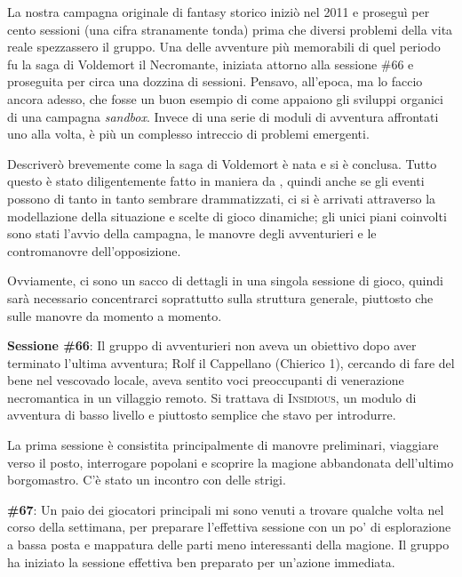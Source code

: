 
La nostra campagna originale di fantasy storico iniziò nel 2011 e proseguì per cento sessioni (una cifra stranamente tonda) prima che diversi problemi della vita reale spezzassero il gruppo. Una delle avventure più memorabili di quel periodo fu la saga di Voldemort il Necromante, iniziata attorno alla sessione \#66 e proseguita per circa una dozzina di sessioni. Pensavo, all'epoca, ma lo faccio ancora adesso, che fosse un buon esempio di come appaiono gli sviluppi organici di una campagna \textit{sandbox}. Invece di una serie di moduli di avventura affrontati uno alla volta, è più un complesso intreccio di problemi emergenti.

Descriverò brevemente come la saga di Voldemort è nata e si è conclusa. Tutto questo è stato diligentemente fatto in maniera da , quindi anche se gli eventi possono di tanto in tanto sembrare drammatizzati, ci si è arrivati attraverso la modellazione della situazione e scelte di gioco dinamiche; gli unici piani coinvolti sono stati l'avvio della campagna, le manovre degli avventurieri e le contromanovre dell'opposizione.

Ovviamente, ci sono un sacco di dettagli in una singola sessione di gioco, quindi sarà necessario concentrarci soprattutto sulla struttura generale, piuttosto che sulle manovre da momento a momento.

\textbf{Sessione \#66}: Il gruppo di avventurieri non aveva un obiettivo dopo aver terminato l'ultima avventura; Rolf il Cappellano (Chierico 1), cercando di fare del bene nel vescovado locale, aveva sentito voci preoccupanti di venerazione necromantica in un villaggio remoto. Si trattava di \textsc{Insidious}, un modulo di avventura di basso livello e piuttosto semplice che stavo per introdurre.

La prima sessione è consistita principalmente di manovre preliminari, viaggiare verso il posto, interrogare popolani e scoprire la magione abbandonata dell'ultimo borgomastro. C'è stato un incontro con delle strigi.

\textbf{\#67}: Un paio dei giocatori principali mi sono venuti a trovare qualche volta nel corso della settimana, per preparare l'effettiva sessione con un po' di esplorazione a bassa posta e mappatura delle parti meno interessanti della magione. Il gruppo ha iniziato la sessione effettiva ben preparato per un'azione immediata.

